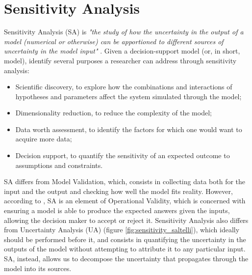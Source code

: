 
\section{Sensitivity Analysis} \label{sec:ch2_sa}

Sensitivity Analysis (SA) is \textit{"the study of how the uncertainty in the output of a model  (numerical or otherwise)  can  be  apportioned to  different  sources  of uncertainty in the model input"} \cite{Saltelli2002SensitivityAF}. 
Given a decision-support model (or, in short, model), \textcite{RAZAVI2021104954} identify several purposes a researcher can address through sensitivity analysis:
\begin{itemize}
    \item Scientific discovery, to explore how the combinations and interactions of hypotheses and parameters affect the system simulated through the model;
    \item Dimensionality reduction, to reduce the complexity of the model;
    \item Data worth assessment, to identify the factors for which one would want to acquire more data;
    \item Decision support, to quantify the sensitivity of an expected outcome to assumptions and constraints.
\end{itemize}

SA differs from Model Validation, which, consists in collecting data both for the input and the output and checking how well the model fits reality. However, according to \textcite{Gass1983FeatureA}, SA is an element of Operational Validity, which is concerned with ensuring a model is able to produce the expected answers given the inputs, allowing the decision maker to accept or reject it.
Sensitivity Analysis also differs from Uncertainty Analysis (UA) (figure \ref{fig:sensitivity_saltelli}), which ideally should be performed before it, and consists in quantifying the uncertainty in the outputs of the model without attempting to attribute it to any particular input. SA, instead, allows us to decompose the uncertainty that propagates through the model into its sources.

